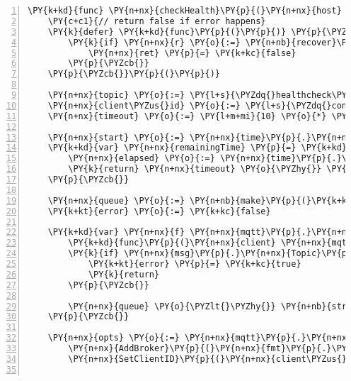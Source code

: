 \begin{Verbatim}[commandchars=\\\{\},numbers=left,firstnumber=1,stepnumber=1,frame=single]
\PY{k+kd}{func} \PY{n+nx}{checkHealth}\PY{p}{(}\PY{n+nx}{host} \PY{k+kt}{string}\PY{p}{,} \PY{n+nx}{port} \PY{k+kt}{int}\PY{p}{)} \PY{p}{(}\PY{n+nx}{ret} \PY{k+kt}{bool}\PY{p}{)} \PY{p}{\PYZob{}}
	\PY{c+c1}{// return false if error happens}
	\PY{k}{defer} \PY{k+kd}{func}\PY{p}{(}\PY{p}{)} \PY{p}{\PYZob{}}
		\PY{k}{if} \PY{n+nx}{r} \PY{o}{:=} \PY{n+nb}{recover}\PY{p}{(}\PY{p}{)}\PY{p}{;} \PY{n+nx}{r} \PY{o}{!=} \PY{k+kc}{nil} \PY{p}{\PYZob{}}
			\PY{n+nx}{ret} \PY{p}{=} \PY{k+kc}{false}
		\PY{p}{\PYZcb{}}
	\PY{p}{\PYZcb{}}\PY{p}{(}\PY{p}{)}

	\PY{n+nx}{topic} \PY{o}{:=} \PY{l+s}{\PYZdq{}healthcheck\PYZdq{}}
	\PY{n+nx}{client\PYZus{}id} \PY{o}{:=} \PY{l+s}{\PYZdq{}control\PYZhy{}plane\PYZhy{}healthcheck\PYZdq{}}
	\PY{n+nx}{timeout} \PY{o}{:=} \PY{l+m+mi}{10} \PY{o}{*} \PY{n+nx}{time}\PY{p}{.}\PY{n+nx}{Second}

	\PY{n+nx}{start} \PY{o}{:=} \PY{n+nx}{time}\PY{p}{.}\PY{n+nx}{Now}\PY{p}{(}\PY{p}{)}\PY{p}{.}\PY{n+nx}{Unix}\PY{p}{(}\PY{p}{)}
	\PY{k+kd}{var} \PY{n+nx}{remainingTime} \PY{p}{=} \PY{k+kd}{func}\PY{p}{(}\PY{p}{)} \PY{n+nx}{time}\PY{p}{.}\PY{n+nx}{Duration} \PY{p}{\PYZob{}}
		\PY{n+nx}{elapsed} \PY{o}{:=} \PY{n+nx}{time}\PY{p}{.}\PY{n+nx}{Now}\PY{p}{(}\PY{p}{)}\PY{p}{.}\PY{n+nx}{Unix}\PY{p}{(}\PY{p}{)} \PY{o}{\PYZhy{}} \PY{n+nx}{start}
		\PY{k}{return} \PY{n+nx}{timeout} \PY{o}{\PYZhy{}} \PY{n+nx}{time}\PY{p}{.}\PY{n+nx}{Duration}\PY{p}{(}\PY{n+nx}{elapsed}\PY{p}{)}
	\PY{p}{\PYZcb{}}

	\PY{n+nx}{queue} \PY{o}{:=} \PY{n+nb}{make}\PY{p}{(}\PY{k+kd}{chan} \PY{k+kt}{string}\PY{p}{)}
	\PY{k+kt}{error} \PY{o}{:=} \PY{k+kc}{false}

	\PY{k+kd}{var} \PY{n+nx}{f} \PY{n+nx}{mqtt}\PY{p}{.}\PY{n+nx}{MessageHandler} \PY{p}{=}
	    \PY{k+kd}{func}\PY{p}{(}\PY{n+nx}{client} \PY{n+nx}{mqtt}\PY{p}{.}\PY{n+nx}{Client}\PY{p}{,} \PY{n+nx}{msg} \PY{n+nx}{mqtt}\PY{p}{.}\PY{n+nx}{Message}\PY{p}{)} \PY{p}{\PYZob{}}
		\PY{k}{if} \PY{n+nx}{msg}\PY{p}{.}\PY{n+nx}{Topic}\PY{p}{(}\PY{p}{)} \PY{o}{!=} \PY{n+nx}{topic} \PY{p}{\PYZob{}}
			\PY{k+kt}{error} \PY{p}{=} \PY{k+kc}{true}
			\PY{k}{return}
		\PY{p}{\PYZcb{}}

		\PY{n+nx}{queue} \PY{o}{\PYZlt{}\PYZhy{}} \PY{n+nb}{string}\PY{p}{(}\PY{n+nx}{msg}\PY{p}{.}\PY{n+nx}{Payload}\PY{p}{(}\PY{p}{)}\PY{p}{)}
	\PY{p}{\PYZcb{}}

	\PY{n+nx}{opts} \PY{o}{:=} \PY{n+nx}{mqtt}\PY{p}{.}\PY{n+nx}{NewClientOptions}\PY{p}{(}\PY{p}{)}\PY{p}{.}
		\PY{n+nx}{AddBroker}\PY{p}{(}\PY{n+nx}{fmt}\PY{p}{.}\PY{n+nx}{Sprintf}\PY{p}{(}\PY{l+s}{\PYZdq{}tcp://\PYZpc{}v:\PYZpc{}v\PYZdq{}}\PY{p}{,} \PY{n+nx}{host}\PY{p}{,} \PY{n+nx}{port}\PY{p}{)}\PY{p}{)}\PY{p}{.}
		\PY{n+nx}{SetClientID}\PY{p}{(}\PY{n+nx}{client\PYZus{}id}\PY{p}{)}


\end{Verbatim}
